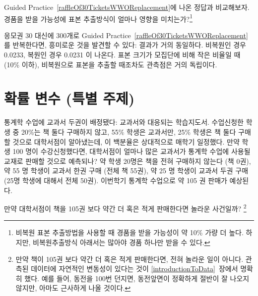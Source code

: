 \begin{exercise} \label{followUpToRaffleOf30TicketsWWOReplacement}
Guided Practice~\ref{raffleOf30TicketsWWOReplacement}에 나온 정답과 비교해보자. 경품을 받을 가능성에 표본 추출방식이 얼마나 영향을 미치는가?\footnote{비복원 표본 추출방법을 사용할 때 경품을 받을 가능성이 약 10\% 가량 더 높다. 하지만, 비복원추출방식 아래서는 많아야 경품 하나만 받을 수 있다.}
\end{exercise}

응모권 30 대신에 300개로 Guided Practice~\ref{raffleOf30TicketsWWOReplacement}를 반복한다면, 흥미로운 것을 발견할 수 있다: 결과가 거의 동일하다. 비복원인 경우 0.0233, 복원인 경우 0.0231 이 나온다. 표본 크기가 모집단에 비해 작은 비율일 때(10\% 이하), 비복원으로 표본을 추출할 때조차도 관측점은 거의 독립이다.

\textC{\newpage}



\section{확률 변수 (특별 주제)}
\label{randomVariablesSection}


\begin{example}{
통계학 수업에 교과서 두권이 배정됐다: 교과서와 대응되는 학습지도서. 수업신청한 학생 중 20\%는 책 둘다 구매하지 않고, 55\% 학생은 교과서만, 25\% 학생은 책 둘다 구매할 것으로 대학서점이 알아냈는데, 이 백분율은 상대적으로 매학기 일정했다. 만약 학생 100 명이 수강신청했다면, 대학서점이 얼마나 많은 교과서가 통계학 수업에 사용될 교재로 판매할 것으로 예측되나?}\label{bookStoreSales}
약 학생 20명은 책을 전혀 구매하지 않는다 (책 0권), 약 55 명 학생이 교과서 한권 구매 (전체 책 55권), 약 25 명 학생이 교과서 두권 구매(25명 학생에 대해서 전체 50권). 이번학기 통계학 수업으로 약 105 권 판매가 예상된다.
\end{example}

\begin{exercise}
만약 대학서점이 책을 105권 보다 약간 더 혹은 적게 판매한다면 놀라운 사건일까?
\footnote{만약 책이 105권 보다 약간 더 혹은 적게 판매한다면, 전혀 놀라운 일이 아니다. 관측된 데이터에 자연적인 변동성이 있다는 것이 \ref{introductionToData}~장에서 명확히 했다. 예를 들어, 동전을 100번 던지면, 동전앞면이 정확하게 절반이 잘 나오지 않지만, 아마도 근사하게 나올 것이다.}
\end{exercise}

